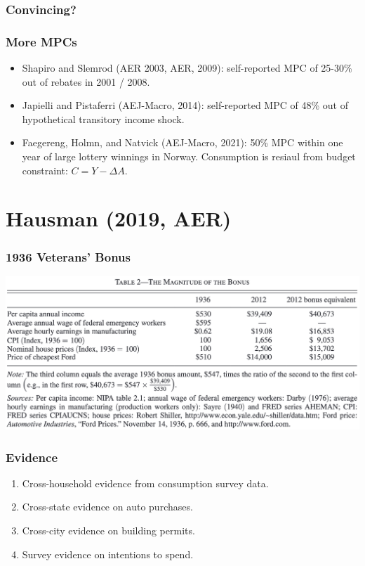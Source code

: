 \documentclass[english,xcolor=svgnames]{beamer}
\begin{document}
\begin{frame}
\frametitle[alignment=center]{Convincing?}

\end{frame}

\begin{frame}
\frametitle[alignment=center]{More MPCs}
\begin{itemize}
	\item Shapiro and Slemrod (AER 2003, AER, 2009): self-reported MPC of 25-30\% out of rebates in 2001 / 2008.
	\item Japielli and Pistaferri (AEJ-Macro, 2014): self-reported MPC of 48\% out of hypothetical transitory income shock.
	\item Faegereng, Holmn, and Natvick (AEJ-Macro, 2021): 50\% MPC within one year of large lottery winnings in Norway. Consumption is resiaul from budget constraint: $C=Y - \Delta A$.
\end{itemize}
\end{frame}

\section{Hausman (2019, AER)}

\begin{frame}
	\frametitle[alignment=center]{1936 Veterans' Bonus}
	\begin{center}
		\includegraphics[scale=0.4]{figures/HTAB2.png}
	\end{center}
\end{frame}

\begin{frame}
	\frametitle[alignment=center]{Evidence}
	\begin{enumerate}
		\item Cross-household evidence from consumption survey data.
		\item Cross-state evidence on auto purchases.
		\item Cross-city evidence on building permits.
		\item Survey evidence on intentions to spend.
	\end{enumerate}
\end{frame}
\end{document}
